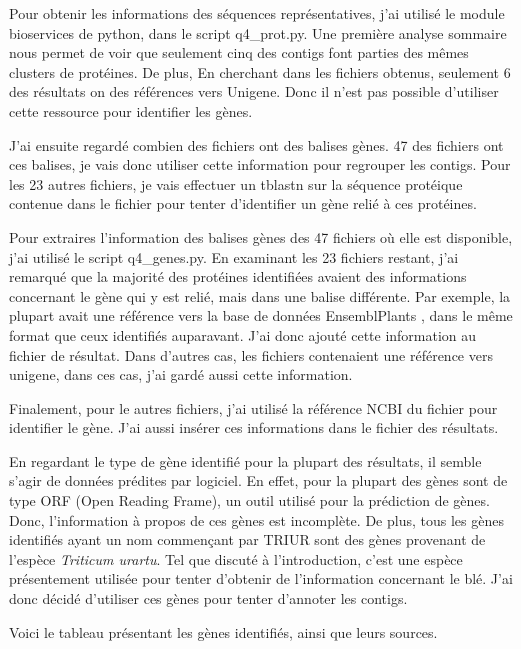 \documentclass[10.9pt]{article} %
\begin{document}
Pour obtenir les informations des séquences représentatives, j'ai utilisé le module bioservices
de python, dans le script q4\_prot.py. Une première analyse sommaire nous permet de voir que
seulement cinq des contigs font parties des mêmes clusters de protéines. De plus, En cherchant dans
les fichiers obtenus, seulement 6 des résultats on des références vers Unigene. Donc il n'est
pas possible d'utiliser cette ressource pour identifier les gènes.

J'ai ensuite regardé combien des fichiers ont des balises gènes. 47 des fichiers ont ces balises, je
vais donc utiliser cette information pour regrouper les contigs. Pour les 23 autres fichiers, je vais
effectuer un tblastn sur la séquence protéique contenue dans le fichier pour tenter d'identifier un
gène relié à ces protéines.

Pour extraires l'information des balises gènes des 47 fichiers où elle est disponible, j'ai utilisé le
script q4\_genes.py. En examinant les 23 fichiers restant, j'ai remarqué que la majorité des protéines
identifiées avaient des informations concernant le gène qui y est relié, mais dans une balise différente.
Par exemple, la plupart avait une référence vers la base de données EnsemblPlants \cite{ENSEMBL}, dans le même format
que ceux identifiés auparavant. J'ai donc ajouté cette information au fichier de résultat. Dans d'autres
cas, les fichiers contenaient une référence vers unigene, dans ces cas, j'ai gardé aussi cette information.

Finalement, pour le autres fichiers, j'ai utilisé la référence NCBI du fichier pour identifier le gène. J'ai aussi
insérer ces informations dans le fichier des résultats.

En regardant le type de gène identifié pour la plupart des résultats, il semble s'agir de données prédites par logiciel.
En effet, pour la plupart des gènes sont de type ORF (Open Reading Frame), un outil utilisé pour la prédiction de gènes.
Donc, l'information à propos de ces gènes est incomplète. De plus, tous les gènes identifiés ayant un nom commençant
par TRIUR sont des gènes provenant de l'espèce \emph{Triticum urartu}. Tel que discuté à l'introduction, c'est une
espèce présentement utilisée pour tenter d'obtenir de l'information concernant le blé. J'ai donc décidé d'utiliser ces
gènes pour tenter d'annoter les contigs.

Voici le tableau présentant les gènes identifiés, ainsi que leurs sources.


\end{document}
